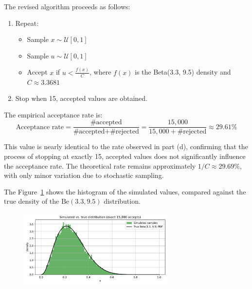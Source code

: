 
\medskip
The revised algorithm proceeds as follows:
\begin{enumerate}
    \item Repeat:
    \begin{itemize}
        \item Sample \( x \sim \mathcal{U}[0, 1] \)
        \item Sample \( u \sim \mathcal{U}[0, 1] \)
        \item Accept \( x \) if \( u < \frac{f(x)}{C} \), where \( f(x) \) is the Beta(3.3, 9.5) density and \( C \approx 3.3681 \)
    \end{itemize}
    \item Stop when 15, accepted values are obtained.
\end{enumerate}


The empirical acceptance rate is:
\[
\text{Acceptance rate} = \frac{\text{\# accepted}}{\text{\# accepted} + \text{\# rejected}} = \frac{15,\!000}{15,\!000 + \text{\# rejected}} \approx 29.61\%
\]

This value is nearly identical to the rate observed in part (d), confirming that the process of stopping at exactly 15, accepted values does not significantly influence the acceptance rate. The theoretical rate remains approximately \( 1/C \approx 29.69\% \), with only minor variation due to stochastic sampling.

\medskip
The Figure~\ref{fig:7f} shows the histogram of the simulated values, compared against the true density of the \(\text{Be}(3.3, 9.5)\) distribution.

\begin{figure}[H]
    \centering
    \includegraphics[width=0.7\textwidth]{resources/figures/q7f-beta_fixed_15k_accepts.pdf}
    \label{fig:7f}
\end{figure}


